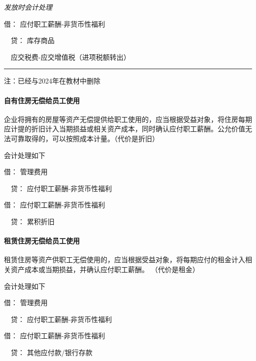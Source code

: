 \documentclass[UTF8,12pt]{ctexart}
\newenvironment{Dr}{\noindent 借：}{\par}
\newenvironment{Cr}{\noindent \ \ 贷：}{\par}
\numberwithin{equation}{section} %
\numberwithin{figure}{section}
\numberwithin{table}{section}
\begin{document}
	\textit{发放时会计处理}
	
	\begin{Dr}
		应付职工薪酬-非货币性福利
	\end{Dr}
	\begin{Cr}
		库存商品
		
		\ \ 应交税费-应交增值税（进项税额转出）
	\end{Cr}

	\vspace{5pt}
	\hrule
	\vspace{5pt}
	注：已经与2024年在教材中删除

	\paragraph{自有住房无偿给员工使用}
	企业将拥有的房屋等资产无偿提供给职工使用的，应当根据受益对象，将住房每期应计提的折旧计入当期损益或相关资产成本，同时确认应付职工薪酬。公允价值无法可靠取得的，可以按照成本计量。（代价是折旧）
	
	会计处理如下
	
	\begin{Dr}
		管理费用
	\end{Dr}
	\begin{Cr}
		应付职工薪酬-非货币性福利
	\end{Cr}

	\begin{Dr}
		应付职工薪酬-非货币性福利
	\end{Dr}
	\begin{Cr}
		累积折旧
	\end{Cr}
	
	
	\paragraph{租赁住房无偿给员工使用}
	租赁住房等资产供职工无偿使用的，应当根据受益对象，将每期应付的租金计入相关资产成本或当期损益，并确认应付职工薪酬。
	（代价是租金）
	
	会计处理如下
	
	\begin{Dr}
		管理费用
	\end{Dr}
	\begin{Cr}
		应付职工薪酬-非货币性福利
	\end{Cr}
	
	\begin{Dr}
		应付职工薪酬-非货币性福利
	\end{Dr}
	\begin{Cr}
		其他应付款/银行存款
	\end{Cr}
	
\end{document}
